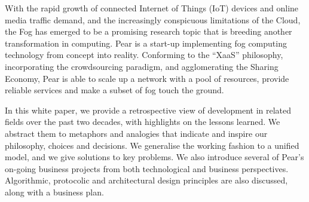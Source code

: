 With the rapid growth of connected Internet of Things (IoT) devices and online media traffic demand, and the increasingly conspicuous limitations of the Cloud, the Fog has emerged to be a promising research topic that is breeding another transformation in computing. Pear is a start-up implementing fog computing technology from concept into reality. Conforming to the ``XaaS'' philosophy, incorporating the crowdsourcing paradigm, and agglomerating the Sharing Economy, Pear is able to scale up a network with a pool of resources, provide reliable services and make a subset of fog touch the ground. 

In this white paper, we provide a retrospective view of development in related fields over the past two decades, with highlights on the lessons learned. We abstract them to metaphors and analogies that indicate and inspire our philosophy, choices and decisions. We generalise the working fashion to a unified model, and we give solutions to key problems. We also introduce several of Pear's on-going business projects from both technological and business perspectives. Algorithmic, protocolic and architectural design principles are also discussed, along with a business plan.   

